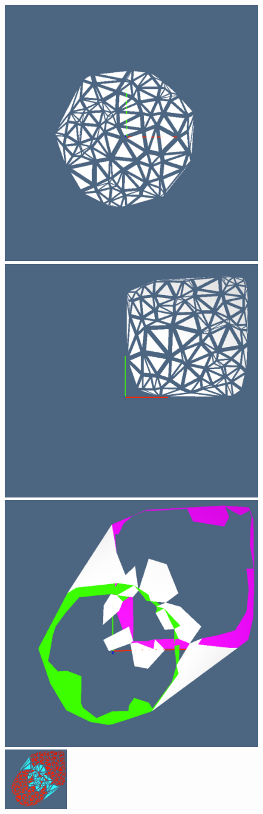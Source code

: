 \documentclass[11pt,oneside]{article}	%
\begin{document}
\begin{figure}[htbp] %
   \includegraphics[height=0.245\linewidth,width=0.245\linewidth]{images/boolchain0a} 
   \includegraphics[height=0.245\linewidth,width=0.245\linewidth]{images/boolchain0b} 
   \includegraphics[height=0.245\linewidth,width=0.245\linewidth]{images/boolchain0c} 
   \includegraphics[height=0.245\linewidth,width=0.245\textwidth]{images/boolchain0d} 


\end{figure}
\end{document}
